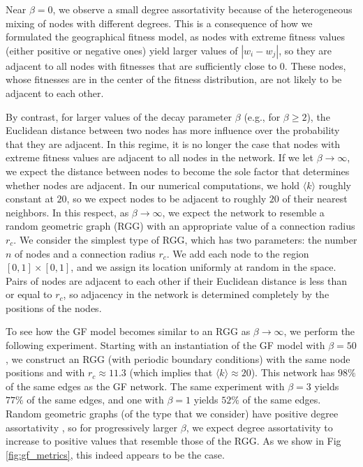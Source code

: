 \documentclass[%
 reprint,
 amsmath,amssymb,
 aps,
]{revtex4-1}
\begin{document}
Near $\beta = 0$, we observe a small degree assortativity because of the heterogeneous mixing of nodes with different degrees. This is a consequence of how we formulated the geographical fitness model, as nodes with extreme fitness values (either positive or negative ones) yield larger values of $|w_i - w_j|$, so they are adjacent to all nodes with fitnesses that are sufficiently close to $0$. These nodes, whose fitnesses are in the center of the fitness distribution, are not likely to be adjacent to each other.

By contrast, for larger values of the decay parameter $\beta$ (e.g., for $\beta \geq 2$), the Euclidean distance between two nodes has more influence over the probability that they are adjacent. In this regime, it is no longer the case that nodes with extreme fitness values are adjacent to all nodes in the network. If we let $\beta \rightarrow \infty$, we expect the distance between nodes to become the sole factor that determines whether nodes are adjacent. In our numerical computations, we hold $\langle k \rangle$ roughly constant at $20$, so we expect nodes to be adjacent to roughly $20$ of their nearest neighbors. In this respect, as $\beta \rightarrow \infty$, we expect the network to resemble a random geometric graph (RGG) \cite{penrose-rgg, rgg} with an appropriate value of a connection radius $r_c$. We consider the simplest type of RGG, which has two parameters: the number $n$ of nodes and a connection radius $r_c$. We add each node to the region $[0, 1] \times [0, 1]$,
 and we assign its location uniformly at random in the space. Pairs of nodes are adjacent to each other if their Euclidean distance is less than or equal to $r_c$, so adjacency in the network is determined completely by the positions of the nodes. 

{\color{red}To see how the GF model becomes similar to an RGG as $\beta \rightarrow \infty$, we perform the following experiment.} Starting with an instantiation of the GF model with $\beta=50$, we construct an RGG (with periodic boundary conditions) with the same node positions and with $r_c \approx 11.3$ (which implies that $\langle k \rangle \approx 20$). This network has $98\%$ of the same edges as the GF network. The same experiment with $\beta=3$ yields $77\%$ of the same edges, and one with $\beta=1$ yields $52\%$ of the same edges. Random geometric graphs (of the type that we consider) have positive degree assortativity \cite{rgg_correlations}, so for progressively larger $\beta$, we expect degree assortativity to increase to positive values that resemble those of the RGG. As we show in Fig \ref{fig:gf_metrics}, this indeed appears to be the case.
\end{document}
